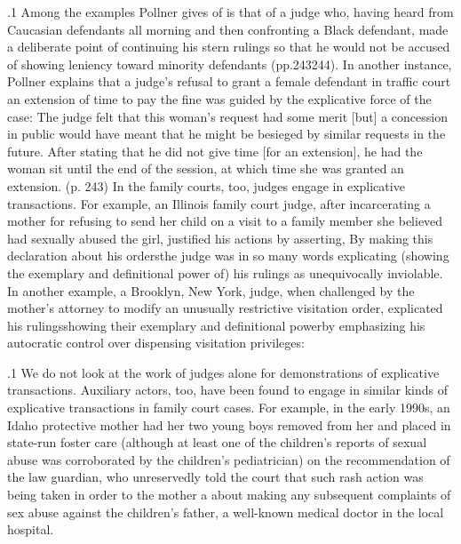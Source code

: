 \documentclass[11pt, twoside]{article}
\begin{document}
{\p.1{%
Among the examples Pollner gives of  is that
of a judge who, having heard from Caucasian defendants all morning
and then confronting a Black defendant, made a deliberate point of continuing his stern rulings so that he would not be accused of showing
leniency toward minority defendants (pp.\@ 243\ndash{}244).
In another instance, Pollner explains that a judge’s refusal to grant a
female defendant in traffic court an extension of time to pay the fine was
guided by the explicative force of the case:
The judge felt that this woman’s request had some merit [but] a
concession in public would have meant that he might be besieged
by similar requests in the future. After stating that he did not give
time [for an extension], he had the woman sit until the end of the
session, at which time she was granted an extension. (p. 243)
In the family courts, too, judges engage in explicative transactions.
For example, an Illinois family court judge, after incarcerating a mother
for refusing to send her child on a visit to a family member she believed
had sexually abused the girl, justified his actions by asserting,  By making this declaration about his orders\mdash{}\mdash{}the judge was in so many words explicating (showing the exemplary and definitional power of) his rulings as
unequivocally inviolable.
In another example, a Brooklyn, New York, judge, when challenged
by the mother’s attorney to modify an unusually restrictive visitation order, explicated his rulings\mdash{}showing their exemplary and definitional
power\mdash{}by emphasizing his autocratic control over dispensing visitation privileges: 
}%

\p.1{%
We do not look at the work of judges alone for demonstrations of
explicative transactions. Auxiliary actors, too, have been found to engage in similar kinds of explicative transactions in family court cases.
For example, in the early 1990s, an Idaho protective mother had her
two young boys removed from her and placed in state-run foster
care (although at least one of the children’s reports of sexual abuse was
corroborated by the children’s pediatrician) on the recommendation of
the law guardian, who unreservedly told the court that such rash
action was being taken in order to  the mother a  about making
any subsequent complaints of sex abuse against the children’s father, a
well-known medical doctor in the local hospital.
}%


}
\end{document}
